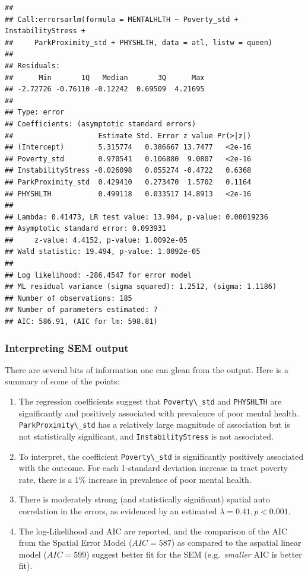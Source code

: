 \documentclass[
]{book}
\newcommand{\passthrough}[1]{#1}
\providecommand{\tightlist}{%
  \setlength{\itemsep}{0pt}\setlength{\parskip}{0pt}}
\begin{document}
\begin{lstlisting}
## 
## Call:errorsarlm(formula = MENTALHLTH ~ Poverty_std + InstabilityStress + 
##     ParkProximity_std + PHYSHLTH, data = atl, listw = queen)
## 
## Residuals:
##      Min       1Q   Median       3Q      Max 
## -2.72726 -0.76110 -0.12242  0.69509  4.21695 
## 
## Type: error 
## Coefficients: (asymptotic standard errors) 
##                    Estimate Std. Error z value Pr(>|z|)
## (Intercept)        5.315774   0.386667 13.7477   <2e-16
## Poverty_std        0.970541   0.106880  9.0807   <2e-16
## InstabilityStress -0.026098   0.055274 -0.4722   0.6368
## ParkProximity_std  0.429410   0.273470  1.5702   0.1164
## PHYSHLTH           0.499118   0.033517 14.8913   <2e-16
## 
## Lambda: 0.41473, LR test value: 13.904, p-value: 0.00019236
## Asymptotic standard error: 0.093931
##     z-value: 4.4152, p-value: 1.0092e-05
## Wald statistic: 19.494, p-value: 1.0092e-05
## 
## Log likelihood: -286.4547 for error model
## ML residual variance (sigma squared): 1.2512, (sigma: 1.1186)
## Number of observations: 185 
## Number of parameters estimated: 7 
## AIC: 586.91, (AIC for lm: 598.81)
\end{lstlisting}

\hypertarget{interpreting-sem-output}{%
\subsubsection{Interpreting SEM output}\label{interpreting-sem-output}}

There are several bits of information one can glean from the output. Here is a summary of some of the points:

\begin{enumerate}
\def\labelenumi{\arabic{enumi}.}
\tightlist
\item
  The regression coefficients suggest that \passthrough{\lstinline!Poverty\_std!} and \passthrough{\lstinline!PHYSHLTH!} are significantly and positively associated with prevalence of poor mental health. \passthrough{\lstinline!ParkProximity\_std!} has a relatively large magnitude of association but is not statistically significant, and \passthrough{\lstinline!InstabilityStress!} is not associated.
\item
  To interpret, the coefficient \passthrough{\lstinline!Poverty\_std!} is significantly positively associated with the outcome. For each 1-standard deviation increase in tract poverty rate, there is a 1\% increase in prevalence of poor mental health.
\item
  There is moderately strong (and statistically significant) spatial auto correlation in the errors, as evidenced by an estimated \(\lambda=0.41, p < 0.001\).
\item
  The log-Likelihood and AIC are reported, and the comparison of the AIC from the Spatial Error Model (\(AIC=587\)) as compared to the aspatial linear model (\(AIC=599\)) suggest better fit for the SEM (e.g.~\emph{smaller} AIC is better fit).
\end{enumerate}
\end{document}
